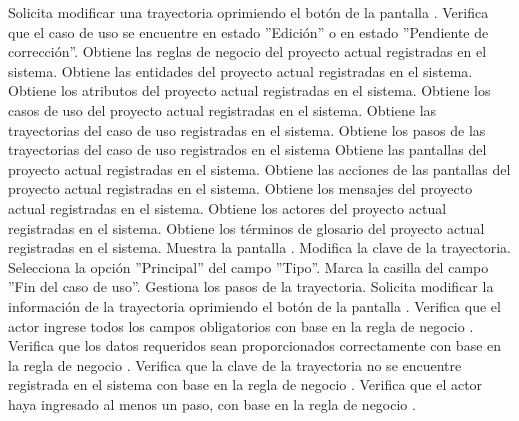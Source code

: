 	\begin{UCtrayectoria}
		\UCpaso[\UCactor] Solicita modificar una trayectoria oprimiendo el botón \editar de la pantalla .
		\UCpaso[\UCactor] Verifica que el caso de uso se encuentre en estado ''Edición'' o en estado ''Pendiente de corrección''. 
		\UCpaso[\UCsist] Obtiene las reglas de negocio del proyecto actual registradas en el sistema.
		\UCpaso[\UCsist] Obtiene las entidades del proyecto actual registradas en el sistema.
		\UCpaso[\UCsist] Obtiene los atributos del proyecto actual registradas en el sistema.
		\UCpaso[\UCsist] Obtiene los casos de uso del proyecto actual registradas en el sistema.
		\UCpaso[\UCsist] Obtiene las trayectorias del caso de uso registradas en el sistema.
		\UCpaso[\UCsist] Obtiene los pasos de las trayectorias del caso de uso registrados en el sistema
		\UCpaso[\UCsist] Obtiene las pantallas del proyecto actual registradas en el sistema.
		\UCpaso[\UCsist] Obtiene las acciones de las pantallas del proyecto actual registradas en el sistema.
		\UCpaso[\UCsist] Obtiene los mensajes del proyecto actual registradas en el sistema.
		\UCpaso[\UCsist] Obtiene los actores del proyecto actual registradas en el sistema.
		\UCpaso[\UCsist] Obtiene los términos de glosario del proyecto actual registradas en el sistema.
		\UCpaso[\UCsist] Muestra la pantalla .
		\UCpaso[\UCactor] Modifica la clave de la trayectoria. \label{CU12.1.1.2-P15}
		\UCpaso[\UCactor] Selecciona la opción ''Principal'' del campo ''Tipo''.  \label{CU12.1.1.2-P16}
		\UCpaso[\UCsist] Marca la casilla del campo ''Fin del caso de uso''.
		\UCpaso[\UCactor] Gestiona los pasos de la trayectoria. \label{CU12.1.1.2-P18}
		\UCpaso[\UCactor] Solicita modificar la información de la trayectoria oprimiendo el botón  de la pantalla .  
		\UCpaso[\UCsist] Verifica que el actor ingrese todos los campos obligatorios con base en la regla de negocio . 
		\UCpaso[\UCsist] Verifica que los datos requeridos sean proporcionados correctamente con base en la regla de negocio .   
		\UCpaso[\UCsist] Verifica que la clave de la trayectoria no se encuentre registrada en el sistema con base en la regla de negocio .  
		\UCpaso[\UCsist] Verifica que el actor haya ingresado al menos un paso, con base en la regla de negocio . 

\end{UCtrayectoria}
